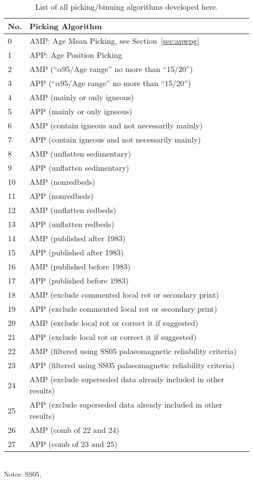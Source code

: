 \begin{table}[!ht]
\centering
\caption{List of all picking/binning algorithms developed here.}\label{tab-pick}
\begin{tabular}{@{}ll@{}}
\toprule
No. & Picking Algorithm \\ \midrule
0 & AMP\@: Age Mean Picking, see Section~\ref{sec:apwpg} \\
1 & APP\@: Age Position Picking \\
2 & AMP (``$\alpha$95/Age range'' no more than ``15/20'') \\
3 & APP (``$\alpha$95/Age range'' no more than ``15/20'') \\
4 & AMP (mainly or only igneous) \\
5 & APP (mainly or only igneous) \\
6 & AMP (contain igneous and not necessarily mainly) \\
7 & APP (contain igneous and not necessarily mainly) \\
8 & AMP (unflatten sedimentary) \\
9 & APP (unflatten sedimentary) \\
10 & AMP (nonredbeds) \\
11 & APP (nonredbeds) \\
12 & AMP (unflatten redbeds) \\
13 & APP (unflatten redbeds) \\
14 & AMP (published after 1983) \\
15 & APP (published after 1983) \\
16 & AMP (published before 1983) \\
17 & APP (published before 1983) \\
18 & AMP (exclude commented local rot or secondary print) \\
19 & APP (exclude commented local rot or secondary print) \\
20 & AMP (exclude local rot or correct it if suggested) \\
21 & APP (exclude local rot or correct it if suggested) \\
22 & AMP (filtered using SS05 palaeomagnetic reliability criteria) \\
23 & APP (filtered using SS05 palaeomagnetic reliability criteria) \\
24 & AMP (exclude superseded data already included in other results) \\
25 & APP (exclude superseded data already included in other results) \\
26 & AMP (comb of 22 and 24) \\
27 & APP (comb of 23 and 25) \\ \bottomrule
\end{tabular}
\raggedright{\\Notes: SS05,~\citet{S05}}
\end{table}

